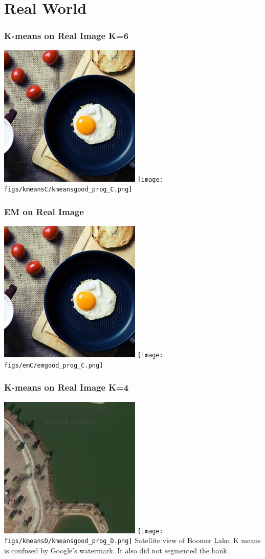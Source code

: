 \documentclass[11pt]{beamer}
\begin{document}
\section{Real World}
\begin{frame}
\frametitle{K-means on Real Image K=6}
\includegraphics[width=.45\textwidth]{mosaicC.jpg}
\texttt{[image: figs/kmeansC/kmeansgood\_prog\_C.png]}
\end{frame}

\begin{frame}
\frametitle{EM on Real Image}
\includegraphics[width=.45\textwidth]{mosaicC.jpg}
\texttt{[image: figs/emC/emgood\_prog\_C.png]}
\end{frame}

\begin{frame}
\frametitle{K-means on Real Image K=4}
\includegraphics[width=.45\textwidth]{mosaicD.jpg}
\texttt{[image: figs/kmeansD/kmeansgood\_prog\_D.png]}
Satellite view of Boomer Lake. K means is confused by Google's watermark. It also did not segmented the bank.
\end{frame}
\end{document}
